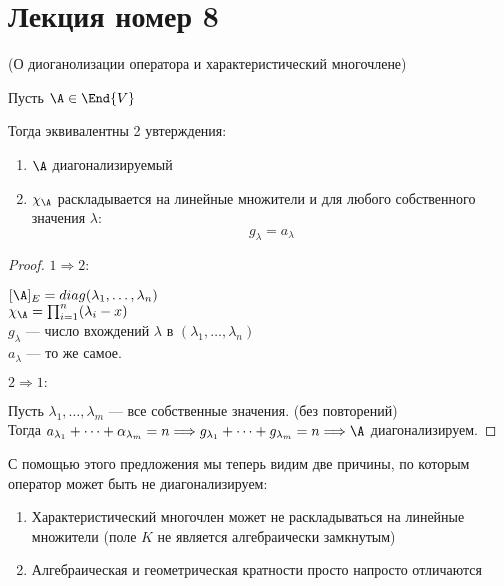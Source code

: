 \section{Лекция номер 8}

\begin{theorem}(О диоганолизации оператора и характеристический многочлене)

    Пусть $\A \in \End{V}$

    Тогда эквивалентны 2 увтерждения:
    \begin{enumerate}
        \item $\A$ диагонализируемый
        \item $\chi_{\A}$ раскладывается на линейные множители
        и для любого собственного значения $\lambda:$
        \[ g_{\lambda} = a_{\lambda} \]
    \end{enumerate}

    \begin{proof} \quad

    \quad$1 \Longrightarrow 2: $

    $[\A]_{E} = diag (\lambda_1, \dots, \lambda_n)$ \\
    $\chi_{\A} = \prod_{i = 1}^{n} (\lambda_i - x)$ \\
    $g_{\lambda}$ --- число вхождений $\lambda$ в $(\lambda_1, \dots, \lambda_n)$ \\
    $a_{\lambda}$ --- то же самое.

    \quad$2 \Longrightarrow 1: $
    
    Пусть $\lambda_1, \dots, \lambda_m$ --- все собственные значения. (без повторений) \\
    Тогда $a_{\lambda_1} + \dots + \alpha_{\lambda_m} = n \Longrightarrow g_{\lambda_1} + \dots + g_{\lambda_m} = n \Longrightarrow \A$ диагонализируем.

    \end{proof}
\end{theorem}

\vspace*{5mm}

С помощью этого предложения мы теперь видим две причины, по которым оператор может быть не диагонализируем:
\begin{enumerate}
    \item Характеристический многочлен может не раскладываться на линейные множители (поле $K$ не является алгебраически замкнутым)
    \item Алгебраическая и геометрическая кратности просто напросто отличаются
\end{enumerate}

